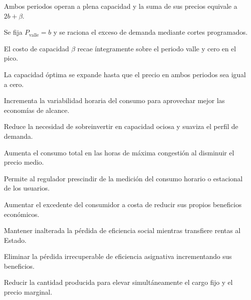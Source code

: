 \begin{opts}
    \item Ambos periodos operan a plena capacidad y la suma de sus precios equivale a $2b + \beta$.
    \item Se fija $P_{\text{valle}} = b$ y se raciona el exceso de demanda mediante cortes programados.
    \item El costo de capacidad $\beta$ recae íntegramente sobre el periodo valle y cero en el pico.
    \item La capacidad óptima se expande hasta que el precio en ambos periodos sea igual a cero.
\end{opts}

\begin{opts}
    \item Incrementa la variabilidad horaria del consumo para aprovechar mejor las economías de alcance.
    \item Reduce la necesidad de sobreinvertir en capacidad ociosa y suaviza el perfil de demanda.
    \item Aumenta el consumo total en las horas de máxima congestión al disminuir el precio medio.
    \item Permite al regulador prescindir de la medición del consumo horario o estacional de los usuarios.
\end{opts}

\begin{opts}
    \item Aumentar el excedente del consumidor a costa de reducir sus propios beneficios económicos.
    \item Mantener inalterada la pérdida de eficiencia social mientras transfiere rentas al Estado.
    \item Eliminar la pérdida irrecuperable de eficiencia asignativa incrementando sus beneficios.
    \item Reducir la cantidad producida para elevar simultáneamente el cargo fijo y el precio marginal.
\end{opts}


